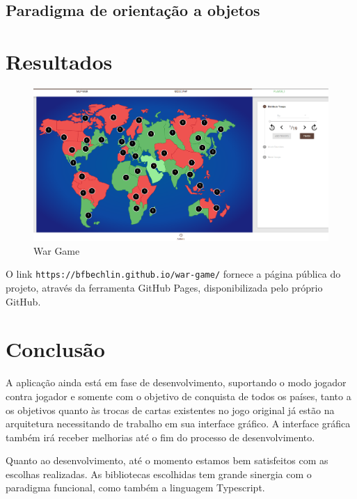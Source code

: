 \documentclass[rel_mlp]{iiufrgs}
\begin{document}
\section{Paradigma de orientação a objetos}

\chapter{Resultados}
\begin{figure}[ht]
\centering
     \includegraphics[width=1.0\textwidth]{partialResults}
      \caption{War Game}
       \label{normal_case}
\end{figure}
\par O link \texttt{https://bfbechlin.github.io/war-game/} fornece a página pública do projeto, através da ferramenta GitHub Pages, disponibilizada pelo próprio GitHub.

\chapter{Conclusão}
A aplicação ainda está em fase de desenvolvimento, suportando o modo jogador contra jogador e somente com o objetivo de conquista de todos os países, tanto a os objetivos quanto às trocas de cartas existentes no jogo original já estão na arquitetura necessitando de trabalho em sua interface gráfico. A interface gráfica também irá receber melhorias até o fim do processo de desenvolvimento. \par
Quanto ao desenvolvimento, até o momento estamos bem satisfeitos com as escolhas realizadas. As bibliotecas escolhidas tem grande sinergia com o paradigma funcional, como também a linguagem Typescript.


\end{document}

